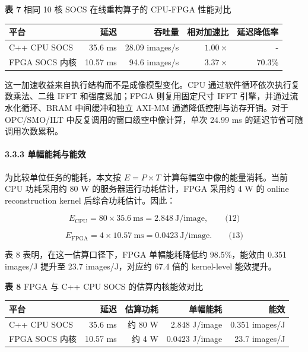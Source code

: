 \textbf{表 7} 相同 10 核 SOCS 在线重构算子的 CPU-FPGA 性能对比

\begin{table}[htbp]
\centering
\begin{tabular}{lrrrr}
\toprule
平台 & 延迟 & 吞吐量 & 相对加速比 & 延迟降低率 \\
\midrule
C++ CPU SOCS & 35.6 ms & 28.09 images/s & $1.00\times$ & - \\
FPGA SOCS 内核 & 10.57 ms & 94.6 images/s & $3.37\times$ & 70.3\% \\
\bottomrule
\end{tabular}
\end{table}

这一加速收益来自执行结构而不是成像模型变化。CPU 通过软件循环依次执行复数乘法、二维 IFFT 和强度累加；FPGA 则复用固定尺寸 IFFT 引擎，并通过流水化循环、BRAM 中间缓冲和独立 AXI-MM 通道降低控制与访存开销。对于 OPC/SMO/ILT 中反复调用的窗口级空中像计算，单次 24.99 ms 的延迟节省可随调用次数累积。

\paragraph{3.3.3 单幅能耗与能效}

为比较单位任务的能耗，本文按 $E=P\times T$ 计算每幅空中像的能量消耗。当前 CPU 功耗采用约 80 W 的服务器运行功耗估计，FPGA 采用约 4 W 的 online reconstruction kernel 后综合功耗估计。因此：

\[
E_{\mathrm{CPU}}=80\times35.6\ \mathrm{ms}=2.848\ \mathrm{J/image},
\qquad\text{(12)}
\]

\[
E_{\mathrm{FPGA}}=4\times10.57\ \mathrm{ms}=0.0423\ \mathrm{J/image}.
\qquad\text{(13)}
\]

表 8 表明，在这一估算口径下，FPGA 单幅能耗降低约 98.5\%，能效由 0.351 images/J 提升至 23.7 images/J，对应约 67.4 倍的 kernel-level 能效提升。

\textbf{表 8} FPGA 与 C++ CPU SOCS 的估算内核能效对比

\begin{table}[htbp]
\centering
\begin{tabular}{lrrrr}
\toprule
平台 & 延迟 & 估算功耗 & 单幅能耗 & 能效 \\
\midrule
C++ CPU SOCS & 35.6 ms & 约 80 W & 2.848 J/image & 0.351 images/J \\
FPGA SOCS 内核 & 10.57 ms & 约 4 W & 0.0423 J/image & 23.7 images/J \\
\bottomrule
\end{tabular}
\end{table}


